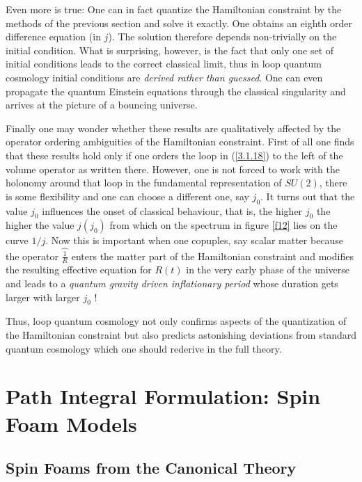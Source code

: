 \documentclass[12pt]{report}
\begin{document}
Even more is true: One can in fact quantize the Hamiltonian constraint by 
the methods of the previous section and solve it exactly. One obtains
an eighth order difference equation (in $j$). The solution 
therefore depends non-trivially on the initial condition. What is 
surprising, however, is the fact that only one set of initial conditions 
leads to the correct classical limit, thus in loop quantum cosmology 
initial conditions are {\it derived rather than guessed}. One can 
even propagate the quantum Einstein equations through the classical 
singularity and arrives at the picture of a bouncing universe.

Finally one may wonder whether these results are qualitatively affected 
by the operator ordering ambiguities of the Hamiltonian constraint. 
First of all one finds that these results hold only if one orders the 
loop in (\ref{3.1.18}) to the left of the volume operator as written there.
However, one is not forced to work with the holonomy around that loop 
in the fundamental representation of $SU(2)$, there is some flexibility
\cite{44} and one can choose a different one, say $j_0$. It turns out 
that the value $j_0$ influences the onset of classical behaviour, that is,
the higher $j_0$ the higher the value $j(j_0)$ from which on the 
spectrum in figure \ref{f12} lies on the curve $1/j$. Now this is important
when one copuples, say scalar matter because the operator 
$\widehat{\frac{1}{R}}$ enters the matter part of the Hamiltonian 
constraint and modifies the resulting effective equation for $R(t)$ in the 
very early phase of the universe and leads to a {\it quantum gravity driven
inflationary period} whose duration gets larger with larger $j_0$ !

Thus, loop quantum cosmology not only confirms aspects of the 
quantization of the Hamiltonian constraint but also predicts astonishing
deviations from standard quantum cosmology which one should rederive in 
the full theory.



\section{Path Integral Formulation: Spin Foam Models}
\label{s3.3}

\subsection{Spin Foams from the Canonical Theory}
\label{s3.3.1}
\end{document}
